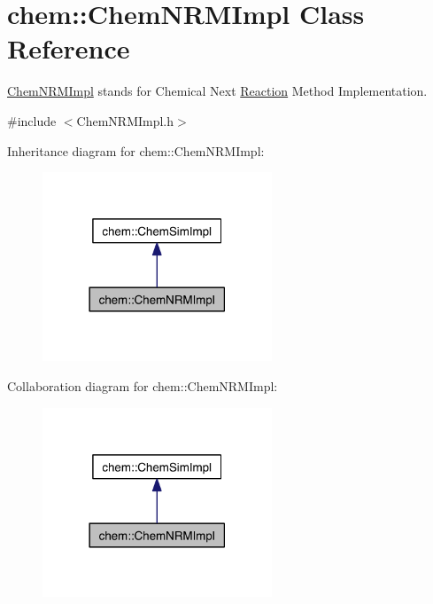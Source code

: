 \hypertarget{classchem_1_1ChemNRMImpl}{\section{chem\-:\-:Chem\-N\-R\-M\-Impl Class Reference}
\label{classchem_1_1ChemNRMImpl}
}


\hyperlink{classchem_1_1ChemNRMImpl}{Chem\-N\-R\-M\-Impl} stands for Chemical Next \hyperlink{classchem_1_1Reaction}{Reaction} Method Implementation.  




{\ttfamily \#include $<$Chem\-N\-R\-M\-Impl.\-h$>$}



Inheritance diagram for chem\-:\-:Chem\-N\-R\-M\-Impl\-:\nopagebreak
\begin{figure}[H]
\begin{center}
\leavevmode
\includegraphics[width=194pt]{classchem_1_1ChemNRMImpl__inherit__graph}
\end{center}
\end{figure}


Collaboration diagram for chem\-:\-:Chem\-N\-R\-M\-Impl\-:\nopagebreak
\begin{figure}[H]
\begin{center}
\leavevmode
\includegraphics[width=194pt]{classchem_1_1ChemNRMImpl__coll__graph}
\end{center}
\end{figure}
